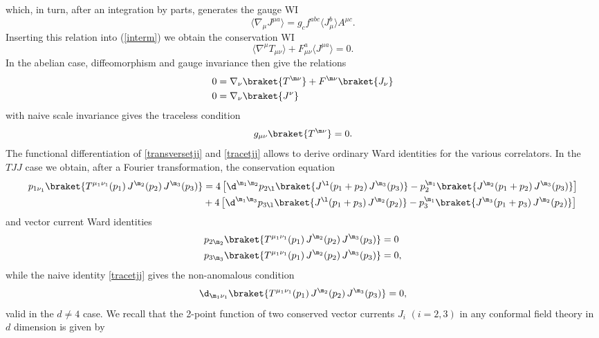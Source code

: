 \documentclass[a4paper,11pt,openright,twoside]{book}
\let\n=\nu      \let\x=\xi     \let\p=\pi      \let\r=\rho
\numberwithin{equation}{section}
\begin{document}
{{{which, in turn, after an integration by parts, generates the gauge WI
\begin{equation}
	\langle \nabla_\mu J^{\mu a} \rangle = g_c f^{a b c} \langle J_\mu^b\rangle A^{\mu c}. 
\end{equation}
Inserting this relation into (\ref{interm}) we obtain the conservation WI
\begin{equation}
	\langle \nabla^\mu T_{\mu\nu}\rangle +F_{\mu\nu}^a \langle J^{\mu a}\rangle =0.
\end{equation}
In the abelian case, diffeomorphism and gauge invariance  then give the relations
\begin{equation}
	\begin{split}
		0&=\nabla_\n \braket{T^{\m \n}}+F^{\m\n}\braket{J_\n}\\
		0&=\nabla_\n\braket{J^\nu}
	\end{split}\label{transversetjj}
\end{equation}
with naive scale invariance gives the traceless condition
\begin{equation}
	g_{\mu\nu}\braket{T^{\m\n}}=0.\label{tracetjj}
\end{equation}
The functional differentiation of \eqref{transversetjj} and \eqref{tracetjj} allows to derive ordinary Ward identities for the various correlators. In the $TJJ$ case we obtain, after a Fourier transformation, the conservation equation 
\begin{align}
	\label{tr}
	p_{1\n_1}\braket{T^{\mu_1\nu_1}(p_1)\,J^{\m_2}(p_2)\,J^{\m_3}(p_3)}&=4\,\big[\d^{\m_1\m_2}p_{2\l}\braket{J^\l(p_1+p_2)\,J^{\m_3}(p_3)}-p_2^{\m_1}\braket{J^{\m_2}(p_1+p_2)\,J^{\m_3}(p_3)}\big]\notag\\
	&+4\,\big[\d^{\m_1\m_3}p_{3\l}\braket{J^\l(p_1+p_3)\,J^{\m_2}(p_2)}-p_3^{\m_1}\braket{J^{\m_3}(p_1+p_3)\,J^{\m_2}(p_2)}\big]
\end{align}
and vector current Ward identities
\begin{align}
	\label{x1}
	p_{2\m_2}\braket{T^{\mu_1\nu_1}(p_1)\,J^{\m_2}(p_2)\,J^{\m_3}(p_3)}&=0\\
	p_{3\m_3}\braket{T^{\mu_1\nu_1}(p_1)\,J^{\m_2}(p_2)\,J^{\m_3}(p_3)}&=0,
\end{align}
while the naive identity \eqref{tracetjj} gives the non-anomalous condition
\begin{equation}
	\label{x2}
	\d_{\m_1\n_1}\braket{T^{\mu_1\nu_1}(p_1)\,J^{\m_2}(p_2)\,J^{\m_3}(p_3)}=0,
\end{equation}
valid in the $d\ne4$ case. We recall that the 2-point function of two conserved vector currents $J_i$ $(i=2,3)$ \cite{Coriano:2013jba} in any conformal field theory in $d$ dimension is given by 
}}}
\end{document}
